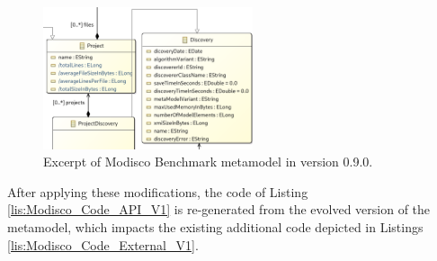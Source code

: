 \begin{figure}
	
	\centering
	\includegraphics[width=0.55\textwidth]{./pics/chapter3pics/example.PNG}
	\caption{Excerpt of Modisco Benchmark metamodel in version 0.9.0.}
	\label{fig: BMM}
\end{figure}



After applying these modifications, the code of Listing \ref{lis:Modisco_Code_API_V1} is re-generated from the evolved version of the metamodel, which impacts the existing additional code depicted in Listings \ref{lis:Modisco_Code_External_V1}. 

